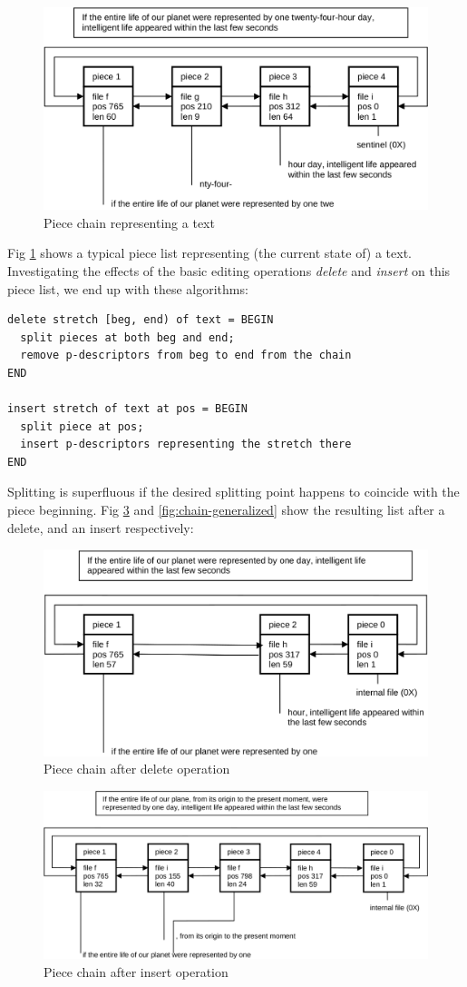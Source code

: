 \begin{figure}[h!]
  \centering
  \includegraphics[width=.8\textwidth]{i/d}
  \caption{Piece chain representing a text}
  \label{fig:chain}
\end{figure}
Fig \ref{fig:chain} shows a typical piece list representing (the current state of) a text.
Investigating the effects of the basic editing operations \emph{delete} and \emph{insert}
on this piece list, we end up with these algorithms:
\begin{verbatim}
delete stretch [beg, end) of text = BEGIN
  split pieces at both beg and end;
  remove p-descriptors from beg to end from the chain
END

insert stretch of text at pos = BEGIN
  split piece at pos;
  insert p-descriptors representing the stretch there
END
\end{verbatim}
Splitting is superfluous if the desired splitting point happens to coincide with
the piece beginning.  Fig \ref{fig:chain-after-insert} and \ref{fig:chain-generalized}
show the resulting list after a delete, and an insert respectively:
\begin{figure}[h!]
  \label{fig:chain-after-delete}
  \centering
  \includegraphics[width=.8\textwidth]{i/e}
  \caption{Piece chain after delete operation}
\end{figure}
\begin{figure}[h!]
  \label{fig:chain-after-insert}
  \centering
  \includegraphics[width=.8\textwidth]{i/f}
  \caption{Piece chain after insert operation}
\end{figure}

